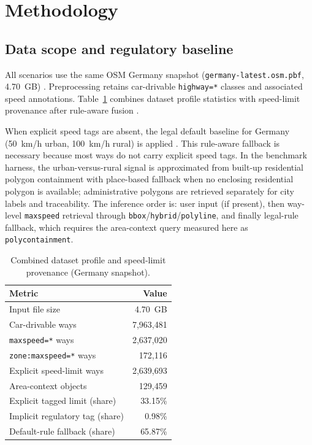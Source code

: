 \documentclass[conference]{IEEEtran}
\begin{document}
\section{Methodology}
\subsection{Data scope and regulatory baseline}
All scenarios use the same OSM Germany snapshot (\texttt{germany-latest.osm.pbf}, \SI{4.70}{GB}) \cite{geofabrik2026}. Preprocessing retains car-drivable \texttt{highway=*} classes and associated speed annotations. Table~\ref{tab:data_profile_provenance} combines dataset profile statistics with speed-limit provenance after rule-aware fusion \cite{osmwiki_highways,osmwiki_maxspeed}.

When explicit speed tags are absent, the legal default baseline for Germany (\SI{50}{km/h} urban, \SI{100}{km/h} rural) is applied \cite{stvo_3}. This rule-aware fallback is necessary because most ways do not carry explicit speed tags. In the benchmark harness, the urban-versus-rural signal is approximated from built-up residential polygon containment with place-based fallback when no enclosing residential polygon is available; administrative polygons are retrieved separately for city labels and traceability. The inference order is: user input (if present), then way-level \texttt{maxspeed} retrieval through \texttt{bbox}/\texttt{hybrid}/\texttt{polyline}, and finally legal-rule fallback, which requires the area-context query measured here as \texttt{polycontainment}.

\begin{table}[!t]
\caption{Combined dataset profile and speed-limit provenance (Germany snapshot).}
\label{tab:data_profile_provenance}
\centering
\begin{tabular}{p{4.8cm}r}
\toprule
Metric & Value \\
\midrule
Input file size & \SI{4.70}{GB} \\
Car-drivable ways & 7{,}963{,}481 \\
\texttt{maxspeed=*} ways & 2{,}637{,}020 \\
\texttt{zone:maxspeed=*} ways & 172{,}116 \\
Explicit speed-limit ways & 2{,}639{,}693 \\
Area-context objects & 129{,}459 \\
\midrule
Explicit tagged limit (share) & 33.15\% \\
Implicit regulatory tag (share) & 0.98\% \\
Default-rule fallback (share) & 65.87\% \\
\bottomrule
\end{tabular}
\end{table}
\end{document}

